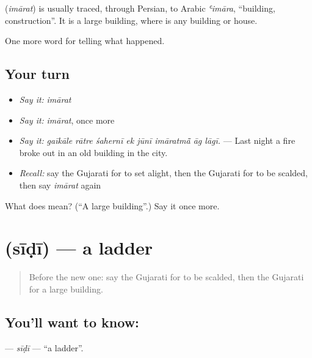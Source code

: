 \begin{cousinweb}
\textbf{} (\emph{imārat}) is usually traced, through Persian, to Arabic \emph{ʿimāra}, \textquotedblleft{}building, construction\textquotedblright{}. It is a large building, where \textbf{} is any building or house.
\end{cousinweb}

\begin{grammarlens}[title={What you've built}]
One more word for telling what happened.
\end{grammarlens}

\subsection*{Your turn}
\begin{itemize}
\raggedright
  \item \emph{Say it:} \emph{imārat}
  \item \emph{Say it:} \emph{imārat}, once more
  \item \emph{Say it:} \emph{gaīkāle rātre śahernī ek jūnī imāratmā̃ āg lāgī.} — Last night a fire broke out in an old building in the city.
  \item \emph{Recall:} say the Gujarati for to set alight, then the Gujarati for to be scalded, then say \emph{imārat} again
\end{itemize}

\begin{tcolorbox}[breakable,colback=teal!4,colframe=teal!35!black,title={Before you move on}]
What does  mean? (\textquotedblleft{}A large building\textquotedblright{}.) Say it once more.
\end{tcolorbox}
\section[\texorpdfstring{\gu{સીડી} (sīḍī)}{સીડી (sīḍī)}]{ (sīḍī) — a ladder}

\label{lesson:GU-C301-sidi}



\begin{quote}
Before the new one: say the Gujarati for to be scalded, then the Gujarati for a large building.
\end{quote}

\subsection*{You'll want to know: }
\textbf{} — \emph{sīḍī} — \textquotedblleft{}a ladder\textquotedblright{}.


